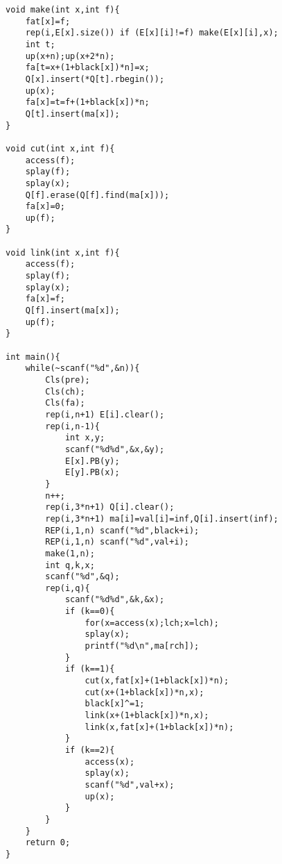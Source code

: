 \begin{verbatim}
void make(int x,int f){
    fat[x]=f;
    rep(i,E[x].size()) if (E[x][i]!=f) make(E[x][i],x);
    int t;
    up(x+n);up(x+2*n);
    fa[t=x+(1+black[x])*n]=x;
    Q[x].insert(*Q[t].rbegin());
    up(x);
    fa[x]=t=f+(1+black[x])*n;
    Q[t].insert(ma[x]);
}

void cut(int x,int f){
    access(f);
    splay(f);
    splay(x);
    Q[f].erase(Q[f].find(ma[x]));
    fa[x]=0;
    up(f);
}

void link(int x,int f){
    access(f);
    splay(f);
    splay(x);
    fa[x]=f;
    Q[f].insert(ma[x]);
    up(f);
}

int main(){
    while(~scanf("%d",&n)){
        Cls(pre);
        Cls(ch);
        Cls(fa);
        rep(i,n+1) E[i].clear();
        rep(i,n-1){
            int x,y;
            scanf("%d%d",&x,&y);
            E[x].PB(y);
            E[y].PB(x);
        }
        n++;
        rep(i,3*n+1) Q[i].clear();
        rep(i,3*n+1) ma[i]=val[i]=inf,Q[i].insert(inf);
        REP(i,1,n) scanf("%d",black+i);
        REP(i,1,n) scanf("%d",val+i);
        make(1,n);
        int q,k,x;
        scanf("%d",&q);
        rep(i,q){
            scanf("%d%d",&k,&x);
            if (k==0){
                for(x=access(x);lch;x=lch);
                splay(x);
                printf("%d\n",ma[rch]);
            }
            if (k==1){
                cut(x,fat[x]+(1+black[x])*n);
                cut(x+(1+black[x])*n,x);
                black[x]^=1;
                link(x+(1+black[x])*n,x);
                link(x,fat[x]+(1+black[x])*n);
            }
            if (k==2){
                access(x);
                splay(x);
                scanf("%d",val+x);
                up(x);
            }
        }
    }
    return 0;
}
\end{verbatim}
